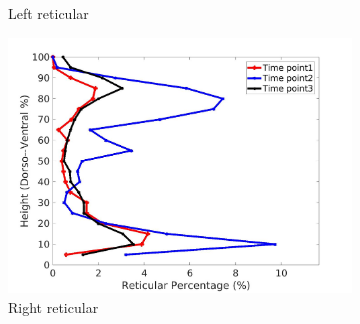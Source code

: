 \begin{figure}[H]
\begin{subfigure}{.4\linewidth}
  \caption{Left reticular}
  \label{fig:IPF2DiseaseDorsoToVentral-c} 
\end{subfigure} 
\begin{subfigure}{.4\linewidth}%
  \includegraphics[width=\linewidth,trim={{.0\wd0} {.0\wd0} {.0\wd0} {.0\wd0}},clip]{Appendix/Image_AppexA/DorsoToVentral/IPF2RightLungReticularDiseaseDorsoToVentral.jpg}
  \caption{Right reticular}
  \label{fig:IPF2DiseaseDorsoToVentral-d}
\end{subfigure}
\begin{subfigure}{.4\linewidth}%

\end{subfigure}
\end{figure}
